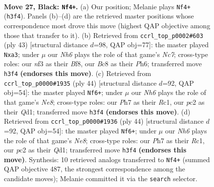 \documentclass[11pt]{article}
\begin{document}
\clearpage

\begin{figure}[p]\centering
\begin{subfigure}{0.46\textwidth}\centering
\resizebox{\linewidth}{!}{%
\newchessgame
\chessboard[
  setfen={1rb4k/ppbq3p/5ppB/3B4/7P/2QP1NPn/PPP2PK1/4R3 b - - 6 27},
  showmover=false,
  pgfstyle=straightmove, color=movearrow, markmove={h3-f4}
]}
\caption{}
\end{subfigure}\hfill
\begin{subfigure}{0.46\textwidth}\centering
\resizebox{\linewidth}{!}{%
\newchessgame
\chessboard[
  setfen={4rbk1/2pq1pp1/7p/pp6/3Pb3/PP3NP1/1Bn2P1P/2RQ1BK1 b - - 3 22},
  showmover=false,
  pgfstyle=straightmove, color=movearrow, markmove={c2-a3}
]}
\caption{}
\end{subfigure}
\\[4pt]
\begin{subfigure}{0.46\textwidth}\centering
\resizebox{\linewidth}{!}{%
\newchessgame
\chessboard[
  setfen={2rqNr2/pb1p1p1k/1p2p1np/4Bp2/2P5/3BP2P/PP4P1/2RQ2K1 w - - 10 23},
  showmover=false,
  pgfstyle=straightmove, color=movearrow, markmove={e8-f6}
]}
\caption{}
\end{subfigure}\hfill
\begin{subfigure}{0.46\textwidth}\centering
\resizebox{\linewidth}{!}{%
\newchessgame
\chessboard[
  setfen={2rqNr2/pb1p1p1k/1p2p1np/4Bp2/2P5/3BP2P/PP4P1/2RQ2K1 w - - 10 23},
  showmover=false,
  pgfstyle=straightmove, color=movearrow, markmove={e8-f6}
]}
\caption{}
\end{subfigure}
\caption{\textbf{Move 27, Black: \texttt{Nf4+}.} (a) Our position; Melanie plays \texttt{Nf4+} (\texttt{h3f4}). Panels (b)--(d) are the retrieved master positions whose correspondence most drove this move (highest QAP objective among those that transfer to it). (b) Retrieved from \texttt{ccrl\_top\_p0002\#603} (ply 43) [structural distance $d$=98, QAP obj=77]: the master played \texttt{Nxa3}; under $\mu$ our \emph{Nh6} plays the role of that game's \emph{Nc7}; cross-type roles: our \emph{n}f3 as their \emph{B}f8, our \emph{B}c8 as their \emph{P}h6; transferred move \texttt{h3f4} \textbf{(endorses this move)}. (c) Retrieved from \texttt{ccrl\_top\_p0000\#1935} (ply 44) [structural distance $d$=92, QAP obj=54]: the master played \texttt{Nf6+}; under $\mu$ our \emph{Nh6} plays the role of that game's \emph{Ne8}; cross-type roles: our \emph{P}h7 as their \emph{R}c1, our \emph{p}c2 as their \emph{Q}d1; transferred move \texttt{h3f4} \textbf{(endorses this move)}. (d) Retrieved from \texttt{ccrl\_top\_p0000\#1936} (ply 44) [structural distance $d$=92, QAP obj=54]: the master played \texttt{Nf6+}; under $\mu$ our \emph{Nh6} plays the role of that game's \emph{Ne8}; cross-type roles: our \emph{P}h7 as their \emph{R}c1, our \emph{p}c2 as their \emph{Q}d1; transferred move \texttt{h3f4} \textbf{(endorses this move)}. Synthesis: 10 retrieved analogs transferred to \texttt{Nf4+} (summed QAP objective 487, the strongest correspondence among the candidate moves); Melanie committed it via the \texttt{search} selector.}
\label{fig:thought-m53}
\end{figure}
\end{document}
